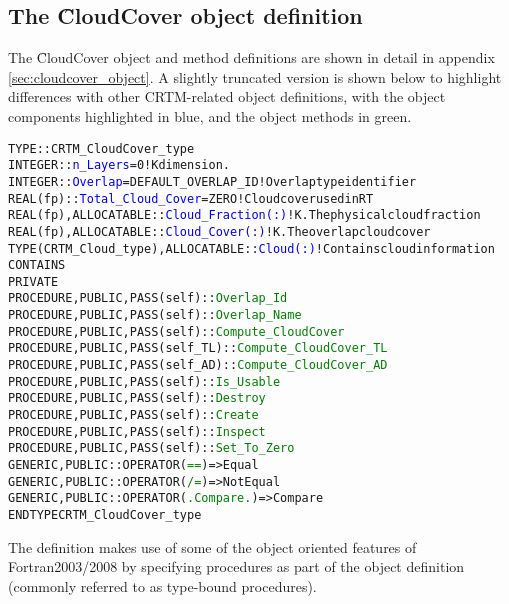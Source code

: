 \subsection{The \f{CloudCover} object definition}

The \f{CloudCover} object and method definitions are shown in detail in appendix \ref{sec:cloudcover_object}. A slightly truncated version is shown below to highlight differences with other CRTM-related object definitions, with the object components highlighted in blue, and the object methods in green.

\begin{alltt}
  TYPE :: CRTM_CloudCover_type
    INTEGER  :: \textcolor{blue}{n_Layers} = 0                            ! K dimension.
    INTEGER  :: \textcolor{blue}{Overlap}           = DEFAULT_OVERLAP_ID  ! Overlap type identifier
    REAL(fp) :: \textcolor{blue}{Total_Cloud_Cover} = ZERO                ! Cloud cover used in RT
    REAL(fp), ALLOCATABLE :: \textcolor{blue}{Cloud_Fraction(:)}          ! K. The physical cloud fraction
    REAL(fp), ALLOCATABLE :: \textcolor{blue}{Cloud_Cover(:)}             ! K. The overlap cloud cover
    TYPE(CRTM_Cloud_type), ALLOCATABLE :: \textcolor{blue}{Cloud(:)}      ! Contains cloud information
  CONTAINS
    PRIVATE
    PROCEDURE, PUBLIC, PASS(self)    :: \textcolor{green}{Overlap_Id}
    PROCEDURE, PUBLIC, PASS(self)    :: \textcolor{green}{Overlap_Name}
    PROCEDURE, PUBLIC, PASS(self)    :: \textcolor{green}{Compute_CloudCover}
    PROCEDURE, PUBLIC, PASS(self_TL) :: \textcolor{green}{Compute_CloudCover_TL}
    PROCEDURE, PUBLIC, PASS(self_AD) :: \textcolor{green}{Compute_CloudCover_AD}
    PROCEDURE, PUBLIC, PASS(self)    :: \textcolor{green}{Is_Usable}
    PROCEDURE, PUBLIC, PASS(self)    :: \textcolor{green}{Destroy}
    PROCEDURE, PUBLIC, PASS(self)    :: \textcolor{green}{Create}
    PROCEDURE, PUBLIC, PASS(self)    :: \textcolor{green}{Inspect}
    PROCEDURE, PUBLIC, PASS(self)    :: \textcolor{green}{Set_To_Zero}
    GENERIC, PUBLIC :: OPERATOR(\textcolor{green}{==}) => Equal
    GENERIC, PUBLIC :: OPERATOR(\textcolor{green}{/=}) => NotEqual
    GENERIC, PUBLIC :: OPERATOR(\textcolor{green}{.Compare.}) => Compare
  END TYPE CRTM_CloudCover_type\end{alltt}

The definition makes use of some of the object oriented features of Fortran2003/2008 by specifying procedures as part of the object definition (commonly referred to as type-bound procedures).

